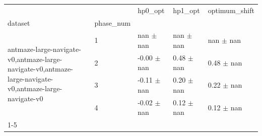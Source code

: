 \begin{tabular}{lllll}
\toprule
 &  & hp0_opt & hp1_opt & optimum_shift \\
dataset & phase_num &  &  &  \\
\midrule
\multirow[t]{4}{*}{antmaze-large-navigate-v0,antmaze-large-navigate-v0,antmaze-large-navigate-v0,antmaze-large-navigate-v0} & 1 & nan $\pm$ nan & nan $\pm$ nan & nan $\pm$ nan \\
 & 2 & -0.00 $\pm$ nan & 0.48 $\pm$ nan & 0.48 $\pm$ nan \\
 & 3 & -0.11 $\pm$ nan & 0.20 $\pm$ nan & 0.22 $\pm$ nan \\
 & 4 & -0.02 $\pm$ nan & 0.12 $\pm$ nan & 0.12 $\pm$ nan \\
\cline{1-5}
\bottomrule
\end{tabular}
